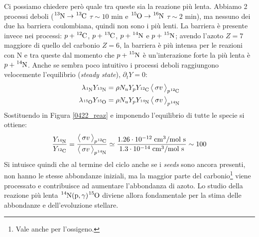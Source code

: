 \noindent Ci possiamo chiedere però quale tra queste sia la reazione più lenta. Abbiamo 2 processi deboli ($\ce{^{13}N}\to\ce{^{13}C}$ $\tau\sim 10$ min e $\ce{^{15}O}\to\ce{^{16}N}$ $\tau\sim 2$ min), ma nessuno dei due ha barriera coulombiana, quindi non sono i più lenti. La barriera è presente invece nei processi: $p+\ce{^{12}C}$, $p+\ce{^{13}C}$, $p+\ce{^{14}N}$ e $p+\ce{^{15}N}$; avendo l'azoto $Z=7$ maggiore di quello del carbonio $Z=6$, la barriera è più intensa per le reazioni con N e tra queste dal momento che $p+\ce{^{15}N}$ è un'interazione forte la più lenta è $p+\ce{^{14}N}$. Anche se sembra poco intuitivo i processi deboli raggiungono velocemente l'equilibrio (\textit{steady state}), $\partial_t Y =0$:
\begin{align*}
	\lambda_{\ce{^{1}N}} Y_{\ce{^{13}N}} &= \rho N_u Y_p Y_{\ce{^{12}C}} \, \mean{\sigma v}_{p\ce{^{12}C}} \\
	\lambda_{\ce{^{15}O}} Y_{\ce{^{15}O}} &= \rho N_u Y_p Y_{\ce{^{14}N}} \, \mean{\sigma v}_{p\ce{^{14}N}}	
\end{align*}
\noindent Sostituendo in Figura \ref{0422_reaz} e imponendo l'equilibrio di tutte le specie si ottiene:
$$\frac{Y_{\ce{^{14}N}}}{Y_{\ce{^{12}C}}} = \frac{\mean{\sigma v}_{p\ce{^{12}C}}}{\mean{\sigma v}_{p\ce{^{14}N}}} \simeq \frac{1.26 \cdot\ord{-12}\unit{cm}^3/\mbox{mol s}}{1.3 \cdot\ord{-14}\unit{cm}^3/\mbox{mol s}}\sim 100$$
Si intuisce quindi che al termine del ciclo anche se i \textit{seeds} sono ancora presenti, non hanno le stesse abbondanze iniziali, ma la maggior parte del carbonio\footnote{Vale anche per l'ossigeno.} viene processato e contribuisce ad aumentare l'abbondanza di azoto. Lo studio della reazione più lenta $\ce{^{14}N(p,\gamma)\ce{^{15}O}}$ diviene allora fondamentale per la stima delle abbondanze e dell'evoluzione stellare.

